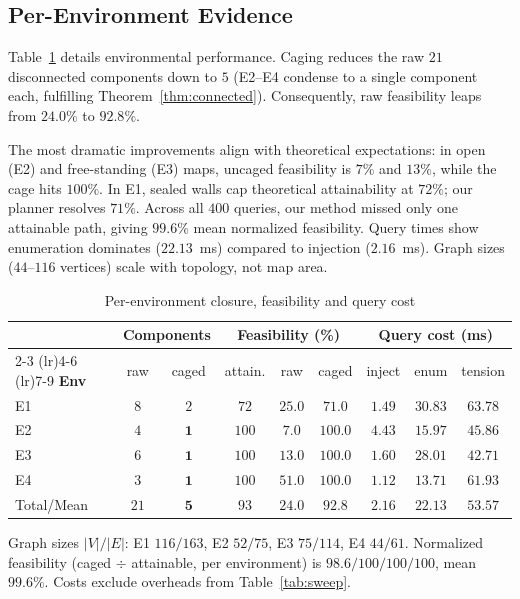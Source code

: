 \documentclass[conference]{IEEEtran}
\begin{document}
\subsection{Per-Environment Evidence}

Table~\ref{tab:perenv} details environmental performance. Caging reduces the raw $21$ disconnected components down to $5$ (E2--E4 condense to a single component each, fulfilling Theorem~\ref{thm:connected}). Consequently, raw feasibility leaps from $24.0\%$ to $92.8\%$.

The most dramatic improvements align with theoretical expectations: in open (E2) and free-standing (E3) maps, uncaged feasibility is $7\%$ and $13\%$, while the cage hits $100\%$. In E1, sealed walls cap theoretical attainability at $72\%$; our planner resolves $71\%$. Across all $400$ queries, our method missed only one attainable path, giving $99.6\%$ mean normalized feasibility. Query times show enumeration dominates ($22.13$~ms) compared to injection ($2.16$~ms). Graph sizes ($44$--$116$ vertices) scale with topology, not map area.

\begin{table}[htbp]
\caption{Per-environment closure, feasibility and query cost}
\label{tab:perenv}

\setlength{\tabcolsep}{3.5pt}
\begin{tabular}{@{}lcccccccc@{}}
\toprule
& \multicolumn{2}{c}{\textbf{Components}} & \multicolumn{3}{c}{\textbf{Feasibility (\%)}} & \multicolumn{3}{c}{\textbf{Query cost (ms)}} \\
\cmidrule(lr){2-3} \cmidrule(lr){4-6} \cmidrule(lr){7-9}
\textbf{Env} & raw & caged & attain. & raw & caged & inject & enum & tension \\ \midrule
E1 & $8$ & $2$ & $72$ & $25.0$ & $71.0$ & $1.49$ & $30.83$ & $63.78$ \\
E2 & $4$ & $\mathbf{1}$ & $100$ & $7.0$ & $\mathbf{100.0}$ & $4.43$ & $15.97$ & $45.86$ \\
E3 & $6$ & $\mathbf{1}$ & $100$ & $13.0$ & $\mathbf{100.0}$ & $1.60$ & $28.01$ & $42.71$ \\
E4 & $3$ & $\mathbf{1}$ & $100$ & $51.0$ & $\mathbf{100.0}$ & $1.12$ & $13.71$ & $61.93$ \\ \midrule
Total/Mean & $21$ & $\mathbf{5}$ & $93$ & $24.0$ & $\mathbf{92.8}$ & $2.16$ & $22.13$ & $53.57$ \\ \bottomrule
\end{tabular}

\vspace{3pt}
\footnotesize Graph sizes $|V|/|E|$: E1 $116/163$, E2 $52/75$, E3 $75/114$, E4 $44/61$. Normalized feasibility (caged $\div$ attainable, per environment) is $98.6/100/100/100$, mean $99.6\%$. Costs exclude overheads from Table~\ref{tab:sweep}.
\end{table}
\end{document}
